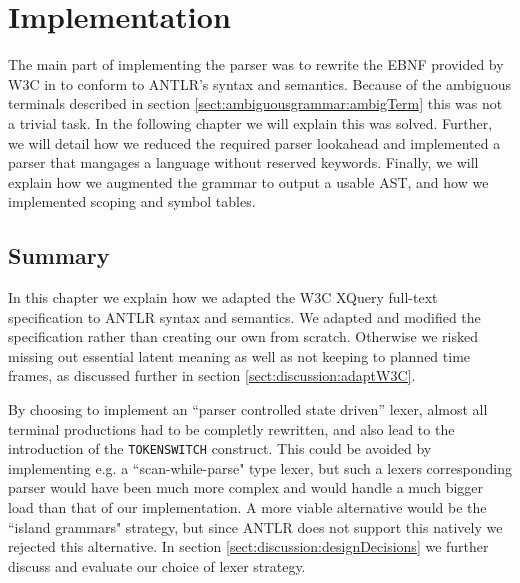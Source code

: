 \chapter{Implementation}
\label{chapter:implementation}

The main part of implementing the parser was to rewrite the EBNF provided by
W3C in \cite{w3c01} to conform to ANTLR's syntax and semantics. Because of the
ambiguous terminals described in section \ref{sect:ambiguousgrammar:ambigTerm}
this was not a trivial task. In the following chapter we will explain this
was solved. Further, we will detail how we reduced the required parser
lookahead and implemented a parser that mangages a language without reserved
keywords. Finally, we will explain how we augmented the grammar to output a
usable AST, and how we implemented scoping and symbol tables.













\section{Summary}
In this chapter we explain how we adapted the W3C
XQuery full-text specification to ANTLR syntax and semantics. We adapted and
modified the specification rather than creating our own from scratch. Otherwise
we risked missing out essential latent meaning as well as not keeping to planned
time frames, as discussed further in section \ref{sect:discussion:adaptW3C}.    

By choosing to implement an ``parser controlled state driven'' lexer, almost all
terminal productions  had to be completly rewritten, and also lead to the
introduction of the \verb!TOKENSWITCH! construct. This could be avoided by
implementing e.g. a ``scan-while-parse" type lexer, but such a lexers
corresponding parser would have been much more complex and would handle a much
bigger load than that of our implementation. A more viable alternative would be
the ``island grammars" strategy, but since ANTLR does not support this natively we
rejected this alternative. In section \ref{sect:discussion:designDecisions} we
further discuss and evaluate our choice of lexer strategy.

